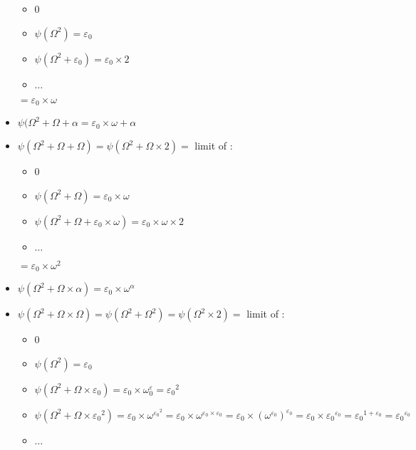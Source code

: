 \documentclass[10pt]{article}
\begin{document}
\begin{itemize}
   \begin{itemize}
     \setlength{\itemsep}{1pt}
     \setlength{\parskip}{0pt}
     \setlength{\parsep}{0pt}
   \item 0
   \item \( \psi(\Omega^2)=\varepsilon_0 \)
   \item \( \psi(\Omega^2+\varepsilon_0) = \varepsilon_0 \times 2 \)
   \item \( \ldots \)
   \end{itemize}
   \( = \varepsilon_0 \times \omega \)
\item \( \psi(\Omega^2+\Omega+\alpha = \varepsilon_0 \times \omega + \alpha \)
\item \( \psi(\Omega^2+\Omega+\Omega) = \psi(\Omega^2+\Omega \times 2) = \) limit of : 
   \begin{itemize}
     \setlength{\itemsep}{1pt}
     \setlength{\parskip}{0pt}
     \setlength{\parsep}{0pt}
   \item 0
   \item \( \psi(\Omega^2+\Omega) = \varepsilon_0 \times \omega \)
   \item \( \psi(\Omega^2+\Omega+\varepsilon_0 \times \omega) = \varepsilon_0 \times \omega \times 2 \)
   \item \( \ldots \)
   \end{itemize}
   \( = \varepsilon_0 \times \omega^2 \)
\item \( \psi(\Omega^2+\Omega \times \alpha) = \varepsilon_0 \times \omega^\alpha \)
\item \( \psi(\Omega^2+\Omega \times \Omega) = \psi(\Omega^2+\Omega^2) = \psi(\Omega^2 \times 2) = \) limit of :
   \begin{itemize}
     \setlength{\itemsep}{1pt}
     \setlength{\parskip}{0pt}
     \setlength{\parsep}{0pt}
   \item 0
   \item \( \psi(\Omega^2) = \varepsilon_0 \)
   \item \( \psi(\Omega^2+\Omega \times \varepsilon_0) = \varepsilon_0 \times \omega^\varepsilon_0 = {\varepsilon_0}^2 \)
   \item \( \psi(\Omega^2+\Omega \times {\varepsilon_0}^2) = \varepsilon_0 \times \omega^{{\varepsilon_0}^2} = \varepsilon_0 \times \omega^{\varepsilon_0 \times \varepsilon_0} = \varepsilon_0 \times (\omega^{\varepsilon_0})^{\varepsilon_0} = \varepsilon_0 \times {\varepsilon_0}^{\varepsilon_0} = {\varepsilon_0}^{1+\varepsilon_0} = {\varepsilon_0}^{\varepsilon_0} \)
   \item \( \ldots \)

\end{itemize}
\end{itemize}
\end{document}

